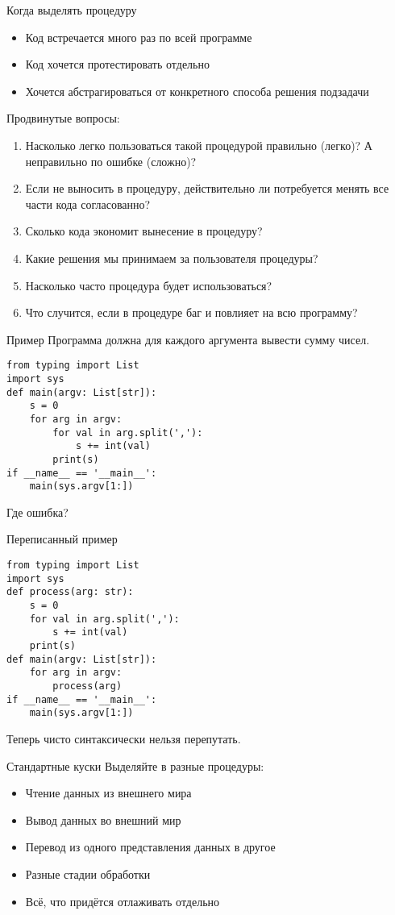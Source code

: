 \begin{frame}{Когда выделять процедуру}
	\begin{itemize}
	\item Код встречается много раз по всей программе
	\item Код хочется протестировать отдельно
	\item Хочется абстрагироваться от конкретного способа решения подзадачи
	\end{itemize}
	
	Продвинутые вопросы:
	\begin{enumerate}
	\item
		Насколько легко пользоваться такой процедурой правильно (легко)?
		А неправильно по ошибке (сложно)?
	\item
		Если не выносить в процедуру, действительно ли потребуется
		менять все части кода согласованно?
	\item
		Сколько кода экономит вынесение в процедуру?
	\item
		Какие решения мы принимаем за пользователя процедуры?
	\item
		Насколько часто процедура будет использоваться?
	\item
		Что случится, если в процедуре баг и повлияет на всю программу?
	\end{enumerate}
\end{frame}

\begin{frame}[fragile]{Пример}
	Программа должна для каждого аргумента вывести сумму чисел.
\begin{verbatim}
from typing import List
import sys
def main(argv: List[str]):
    s = 0
    for arg in argv:
        for val in arg.split(','):
            s += int(val)
        print(s)
if __name__ == '__main__':
    main(sys.argv[1:])
\end{verbatim}
	Где ошибка?
\end{frame}

\begin{frame}[fragile]{Переписанный пример}
\begin{verbatim}
from typing import List
import sys
def process(arg: str):
    s = 0
    for val in arg.split(','):
        s += int(val)
    print(s)
def main(argv: List[str]):
    for arg in argv:
        process(arg)
if __name__ == '__main__':
    main(sys.argv[1:])
\end{verbatim}
	Теперь чисто синтаксически нельзя перепутать.
\end{frame}

\begin{frame}{Стандартные куски}
	Выделяйте в разные процедуры:
	\begin{itemize}
	\item Чтение данных из внешнего мира
	\item Вывод данных во внешний мир
	\item Перевод из одного представления данных в другое
	\item Разные стадии обработки
	\item Всё, что придётся отлаживать отдельно
	\end{itemize}
\end{frame}
